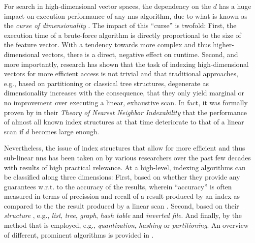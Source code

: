 For search in high-dimensional vector spaces, the dependency on the $d$ has a huge impact on execution performance of any \acrshort{nns} algorithm, due to what is known as the \emph{curse of dimensionality} \cite{Indyk1998:Approximate,Zezula:2006Similarity}. The impact of this ``curse'' is twofold: First, the execution time of a brute-force algorithm is directly proportional to the size of the feature vector. With a tendency towards more complex and thus higher-dimensional vectors, there is a direct, negative effect on runtime. Second, and more importantly, research has shown that the task of indexing high-dimensional vectors for more efficient access is not trivial and that traditional approaches, e.g., based on partitioning or classical tree structures, degenerate as dimensionality increases \cite{Indyk1998:Approximate,Weber:1998Va} with the consequence, that they only yield marginal or no improvement over executing a linear, exhaustive scan. In fact, it was formally proven by \cite{Shaft:2006Theory} in their \emph{Theory of Nearest Neighbor Indexability} that the performance of almost all known index structures at that time deteriorate to that of a linear scan if $d$ becomes large enough.

Nevertheless, the issue of index structures that allow for more efficient and thus sub-linear \acrshort{nns} has been taken on by various researchers over the past few decades with results of high practical relevance. At a high-level, indexing algorithms can be classified along three dimensions: First, based on whether they provide any guarantees w.r.t. to the accuracy of the results, wherein ``accuracy'' is often measured in terms of precission and recall of a result produced by an index as compared to the the result produced by a linear scan \cite{Echihabi:2021High}. Second, based on their \emph{structure} \cite{Shaft:2006Theory}, e.g., \emph{list}, \emph{tree}, \emph{graph}, \emph{hash table} and \emph{inverted file}. And finally, by the method that is employed, e.g., \emph{quantization}, \emph{hashing} or \emph{partitioning}. An overview of different, prominent algorithms is provided in .

